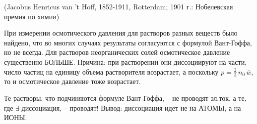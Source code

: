  (Jacobus Henricus van 't Hoff, 1852-1911, Rotterdam; 1901 г.: Нобелевская премия по химии)

 При измерении осмотического давления для растворов разных веществ было найдено, что во многих случаях результаты согласуются с формулой Вант-Гоффа, но не всегда. Для растворов неорганических солей осмоти\-чес\-кое давление существенно БОЛЬШЕ. Причина: при растворении они диссоциируют на части, число частиц на единицу объема растворителя возрастает, а поскольку  $p=\frac23\,n_0\,\overline{w}$, то и осмотическое давление тоже возрастает.

 Те растворы, что подчиняются формуле Вант-Гоффа, -- не проводят эл.ток, а те, где $\exists$ диссоциация, -- проводят! Вывод: диссоциация идет не на АТОМЫ, а на ИОНЫ.
